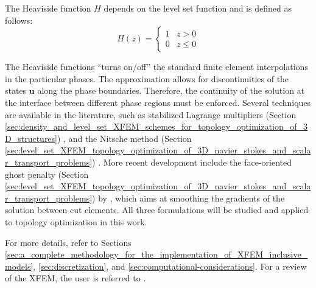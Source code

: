 The Heaviside function $H$ depends on the level set function and is defined as follows:
%
\begin{equation}
	H(z) =
		\begin{cases}
			1 & z > 0 \\
			0 & z \le 0
		\end{cases}
\end{equation}

The Heaviside functions ``turns on/off'' the standard finite element interpolations in the particular phases. The approximation allows for discontinuities of the states $\mathbf{u}$ along the phase boundaries. Therefore, the continuity of the solution at the interface between different phase regions must be enforced. Several techniques are available in the literature, such as stabilized Lagrange multipliers (Section \ref{sec:density_and_level_set_XFEM_schemes_for_topology_optimization_of_3D_structures}) \citep{BH:10}, and the Nitsche method (Section \ref{sec:level_set_XFEM_topology_optimization_of_3D_navier_stokes_and_scalar_transport_problems}) \citep{BH:12}. More recent development include the face-oriented ghost penalty (Section \ref{sec:level_set_XFEM_topology_optimization_of_3D_navier_stokes_and_scalar_transport_problems}) by \citep{SW:14,SRG+:14,BH:12}, which aims at smoothing the gradients of the solution between cut elements. All three formulations will be studied and applied to topology optimization in this work.

For more details, refer to Sections \ref{sec:a_complete_methodology_for_the_implementation_of_XFEM_inclusive_models}, \ref{sec:discretization}, and \ref{sec:computational-considerations}. For a review of the XFEM, the user is referred to \citep{FB:10}.




